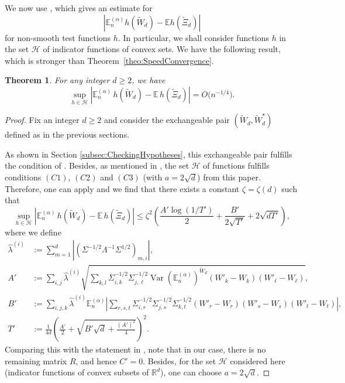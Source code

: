 \documentclass[11pt]{amsart}
\theoremstyle{plain}
\newtheorem{theorem}[lemma]{Theorem}
\theoremstyle{remark}
\newcommand{\RR}{\mathbb{R}}
\newcommand{\HHH}{\mathcal{H}}
\newcommand{\esper}{\mathbb{E}}
\DeclareMathOperator{\Var}{Var}
\begin{document}
We now use \cite[Corollary 3.1]{ReinertRollin2009}, which gives an estimate for
\[ \left| \esper_n^{(\alpha)}h(\tilde{W}_d) - \esper h(\tilde{\Xi}_d) \right|\]
for non-smooth test functions $h$.
In particular, we shall consider functions $h$
in the set $\HHH$ of indicator functions of convex sets.
We have the following result,
which is stronger than Theorem~\ref{theo:SpeedConvergence}.

\begin{theorem}
    For any integer $d \ge 2$, we have
    \[\sup_{h \in \HHH} |\esper_n^{(\alpha)}\, h(\tilde{W}_d) - \esper\, h(\tilde{\Xi}_d)| 
        =O\big(n^{-1/4} \big).\]
    \label{theo:SpeedConvergenceConvex}
\end{theorem}
\begin{proof}
    Fix an integer $d \ge 2$ and consider the exchangeable pair
    $(\tilde{W}_d,\tilde{W}^\star_d)$ defined as in the previous sections.

    As shown in Section \ref{subsec:CheckingHypotheses},
    this exchangeable pair fulfills the condition of \cite[Theorem 2.1]{ReinertRollin2009}.
    Besides, as mentioned in \cite[Section 3]{ReinertRollin2009}, 
    the set $\HHH$ of functions fulfills conditions $(C1)$, $(C2)$ and $(C3)$ 
    (with $a=2\sqrt{d}$) from this paper.
    Therefore, one can apply \cite[Corollary 3.1]{ReinertRollin2009}
    and we find that there exists a constant $\zeta=\zeta(d)$ such that
    \begin{equation}\label{eq:ReinertNonSmooth}
        \sup_{h \in \HHH} |\esper_n^{(\alpha)}\, h(\tilde{W}_d) - \esper\, h(\tilde{\Xi}_d)|
    \le \zeta^ 2 \left(  \frac{A' \log(1/T')}{2} +\frac{B'}{2\sqrt{T'}} +2\sqrt{dT'} \right),
    \end{equation}
    where we define
    \begin{align*}
        \hat{\lambda}^{(i)} &:= \sum_{m=1}^d |(\varSigma^{-1/2} \Lambda^{-1} \varSigma^{1/2})_{m,i}|,\\
        A'&:= \sum_{i,j} \hat{\lambda}^{(i)} \sqrt{\sum_{k,l} \varSigma^{-1/2}_{i,k}  \varSigma^{-1/2}_{j,\ell}
        \Var (\esper_n^{(\alpha)})^{\tilde{W}_d} (W'_k -W_k)(W'_\ell-W_\ell)},\\
        B'&:= \sum_{i,j,k} \hat{\lambda}^{(i)} \esper_n^{(\alpha)} \left|
        \sum_{r,s,t} \varSigma^{-1/2}_{i,r} \varSigma^{-1/2}_{j,s} \varSigma^{-1/2}_{k,t}
        (W'_r -W_r)(W'_s -W_s)(W'_t -W_t)\right|,\\
        T'&:= \frac{1}{4d}\left( \frac{A'}{2} + \sqrt{B'\sqrt{d} + \frac{(A')^2}{4}} \right)^2.
    \end{align*}
    Comparing this with the statement in \cite{ReinertRollin2009}, note that in our case,
    there is no remaining matrix $R$, and hence $C'=0$.
    Besides, for the set $\HHH$ considered here (indicator functions of convex subsets of $\RR^d$),
    one can choose $a=2\sqrt{d}$.


\end{proof}
\end{document}
